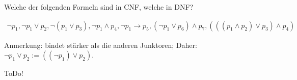 
\begin{exercise}[30]

Welche der folgenden Formeln sind in CNF, welche in DNF?

\begin{align*}
    \neg p_1,
    \neg p_1 \lor p_2,
    \neg (p_1 \lor p_3),
    \neg p_1 \land p_4,
    \neg p_1 \to p_5,
    (\neg p_1 \lor p_6) \land p_7,
    (((p_1 \land p_2) \lor p_3) \land p_4)
\end{align*}

Anmerkung:
\Quote{$\neg$} bindet stärker als die anderen Junktoren;
Daher:
$\neg p_1 \lor p_2 := ((\neg p_1) \lor p_2)$.

\end{exercise}


\begin{solution}

ToDo!

\end{solution}


